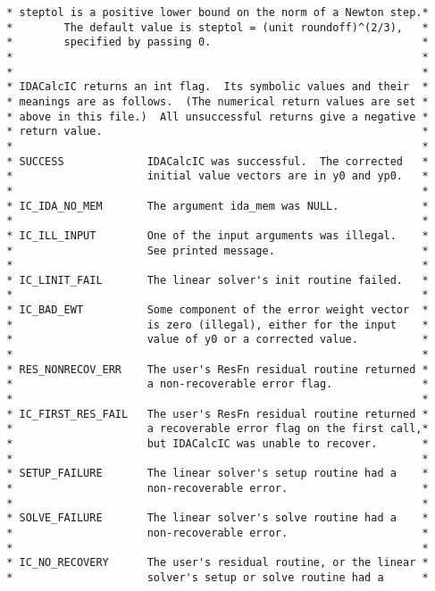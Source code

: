 \begin{verbatim}
 * steptol is a positive lower bound on the norm of a Newton step.*
 *        The default value is steptol = (unit roundoff)^(2/3),   *
 *        specified by passing 0.                                 *
 *                                                                *
 *                                                                *
 * IDACalcIC returns an int flag.  Its symbolic values and their  *
 * meanings are as follows.  (The numerical return values are set *
 * above in this file.)  All unsuccessful returns give a negative *
 * return value.                                                  *
 *                                                                *
 * SUCCESS             IDACalcIC was successful.  The corrected   *
 *                     initial value vectors are in y0 and yp0.   * 
 *                                                                *
 * IC_IDA_NO_MEM       The argument ida_mem was NULL.             *
 *                                                                *
 * IC_ILL_INPUT        One of the input arguments was illegal.    *
 *                     See printed message.                       *
 *                                                                *
 * IC_LINIT_FAIL       The linear solver's init routine failed.   *
 *                                                                *
 * IC_BAD_EWT          Some component of the error weight vector  *
 *                     is zero (illegal), either for the input    *
 *                     value of y0 or a corrected value.          *
 *                                                                *
 * RES_NONRECOV_ERR    The user's ResFn residual routine returned *
 *                     a non-recoverable error flag.              *
 *                                                                *
 * IC_FIRST_RES_FAIL   The user's ResFn residual routine returned *
 *                     a recoverable error flag on the first call,*
 *                     but IDACalcIC was unable to recover.       *
 *                                                                *
 * SETUP_FAILURE       The linear solver's setup routine had a    *
 *                     non-recoverable error.                     *
 *                                                                *
 * SOLVE_FAILURE       The linear solver's solve routine had a    *
 *                     non-recoverable error.                     *
 *                                                                *
 * IC_NO_RECOVERY      The user's residual routine, or the linear *
 *                     solver's setup or solve routine had a      *

\end{verbatim}
